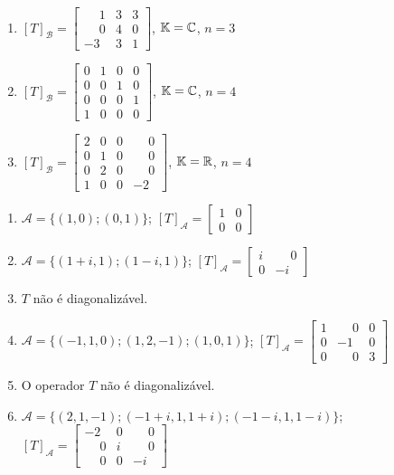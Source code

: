 \documentclass[12pt]{exam}
\begin{document}
\begin{exercicio}
\begin{enumerate}[label=({\alph*})]
    \item $[T]_\mathcal{B} = \begin{bmatrix} \phantom{-} 1 & 3 & 3\\ \phantom{-} 0 & 4 & 0\\ -3 & 3 & 1\end{bmatrix}$, $\mathbb{K} = \mathbb{C}$, $n = 3$
    \item $[T]_\mathcal{B} = \begin{bmatrix} 0 & 1 & 0 & 0\\ 0 & 0 & 1 & 0\\ 0 & 0 & 0 & 1 \\ 1 & 0 & 0 & 0\end{bmatrix}$, $\mathbb{K} = \mathbb{C}$, $n = 4$
    \item $[T]_\mathcal{B} = \begin{bmatrix} 2 & 0 & 0 & \phantom{-}0\\ 0 & 1 & 0 & \phantom{-}0\\ 0 & 2 & 0 & \phantom{-}0 \\ 1 & 0 & 0 & -2\end{bmatrix}$, $\mathbb{K} = \mathbb{R}$, $n = 4$
  \end{enumerate}
  \begin{solucao}
      \begin{enumerate}[label=({\alph*})]
          \item $\mathcal{A} = \{(1,0);(0,1)\}$; $[T]_\mathcal{A} = \begin{bmatrix} 1 & 0\\ 0 & 0\end{bmatrix}$
          \item $\mathcal{A} = \{(1 + i,1);(1 - i,1)\}$; $[T]_\mathcal{A} = \begin{bmatrix} i & \phantom{-} 0\\ 0 & -i\end{bmatrix}$
          \item $T$ não é diagonalizável.
          \item $\mathcal{A} = \{(-1,1,0);(1,2,-1);(1,0,1)\}$; $[T]_\mathcal{A} = \begin{bmatrix} 1 & \phantom{-} 0 & 0\\ 0 & -1 & 0\\0 & \phantom{-} 0 & 3\end{bmatrix}$
          \item O operador $T$ não é diagonalizável.
          \item $\mathcal{A} = \{(2,1,-1);(-1 + i, 1, 1 + i);(-1 - i, 1, 1 - i)\}$; $[T]_\mathcal{A} = \begin{bmatrix} -2 & 0 & \phantom{-} 0\\ \phantom{-} 0 & i & \phantom{-} 0\\ \phantom{-} 0 & 0 & -i\end{bmatrix}$

\end{enumerate}
\end{solucao}
\end{exercicio}
\end{document}
